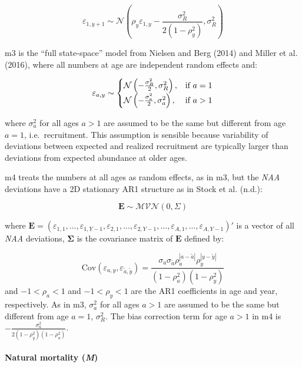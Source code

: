 \documentclass[]{article}
\let\oldparagraph\paragraph
\renewcommand{\paragraph}[1]{\oldparagraph{#1}\mbox{}}
\begin{document}
\[\varepsilon_{1,y+1} \sim \mathcal{N}\left(\rho_y \varepsilon_{1,y} - \frac{\sigma^2_R}{2 (1-\rho^2_y)}, \sigma^2_R \right)\]

m3 is the ``full state-space'' model from Nielsen and Berg (2014) and
Miller et al. (2016), where all numbers at age are independent random
effects and:

\begin{equation}
  \varepsilon_{a,y} \sim \left\{
    \begin{array}{@{}ll@{}}
      \mathcal{N} \left( - \frac{\sigma^2_R}{2}, \sigma^2_R \right), & \text{if}\ a = 1 \\
      \mathcal{N} \left( - \frac{\sigma^2_a}{2}, \sigma^2_a \right), & \text{if}\ a > 1
    \end{array}\right.
\end{equation}

where \(\sigma^2_a\) for all ages \(a > 1\) are assumed to be the same
but different from age \(a = 1\), i.e.~recruitment. This assumption is
sensible because variability of deviations between expected and realized
recruitment are typically larger than deviations from expected abundance
at older ages.

m4 treats the numbers at all ages as random effects, as in m3, but the
\emph{NAA} deviations have a 2D stationary AR1 structure as in Stock et
al. (n.d.):

\[\mathbf{E} \sim \mathcal{MVN} \left( 0, \Sigma \right)\]

where
\(\mathbf{E} = (\varepsilon_{1,1}, \ldots, \varepsilon_{1,Y-1}, \varepsilon_{2,1}, \ldots, \varepsilon_{2,Y-1}, \ldots, \varepsilon_{A,1}, \ldots, \varepsilon_{A,Y-1})'\)
is a vector of all \emph{NAA} deviations, \(\boldsymbol{\Sigma}\) is the
covariance matrix of \(\mathbf{E}\) defined by:

\[ \text{Cov} \left( \varepsilon_{a,y}, \varepsilon_{\tilde{a},\tilde{y}} \right) = \frac{\sigma_a \sigma_{\tilde{a}} \rho^{|a-\tilde{a}|}_{a} \rho^{|y-\tilde{y}|}_{y}}{\left(1-\rho^2_{a}\right) \left(1-\rho^2_{y}\right)}\]
and \(-1<\rho_a<1\) and \(-1<\rho_y<1\) are the AR1 coefficients in age
and year, respectively. As in m3, \(\sigma^2_a\) for all ages \(a > 1\)
are assumed to be the same but different from age \(a = 1\),
\(\sigma^2_R\). The bias correction term for age \(a > 1\) in m4 is
\(- \frac{\sigma^2_a}{2 (1-\rho^2_y)(1-\rho^2_a)}\).

\hypertarget{natural-mortality-m}{%
\paragraph{\texorpdfstring{Natural mortality
(\emph{M})}{Natural mortality (M)}}\label{natural-mortality-m}}
\end{document}
